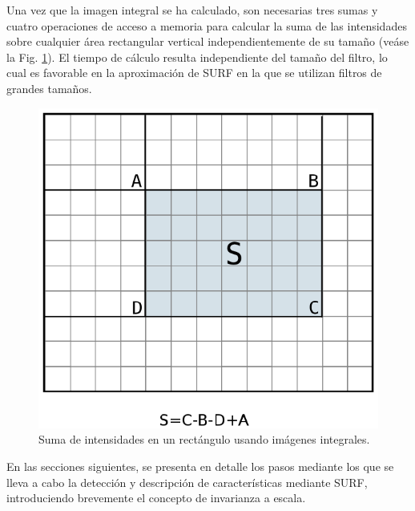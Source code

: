       Una vez que la imagen integral se ha calculado, son necesarias tres sumas y cuatro operaciones de acceso a memoria para calcular la suma de las intensidades sobre cualquier área rectangular vertical independientemente de su tamaño (veáse la Fig. \ref{fig:integral_image_sum}). El tiempo de cálculo resulta independiente del tamaño del filtro, lo cual es favorable en la aproximación de SURF en la que se utilizan filtros de grandes tamaños.
      \begin{figure}[tbhp]
	\centering
	      \includegraphics[scale=0.6]{./figs/sumintegralimages2}
	  \caption[Suma de intensidades usando imágenes integrales]{Suma de intensidades en un rectángulo usando imágenes integrales.}
	\label{fig:integral_image_sum}                %
      \end{figure}

  En las secciones siguientes, se presenta en detalle los pasos mediante los que se lleva a cabo la detección y descripción de características mediante SURF, introduciendo brevemente el concepto de invarianza a escala.
